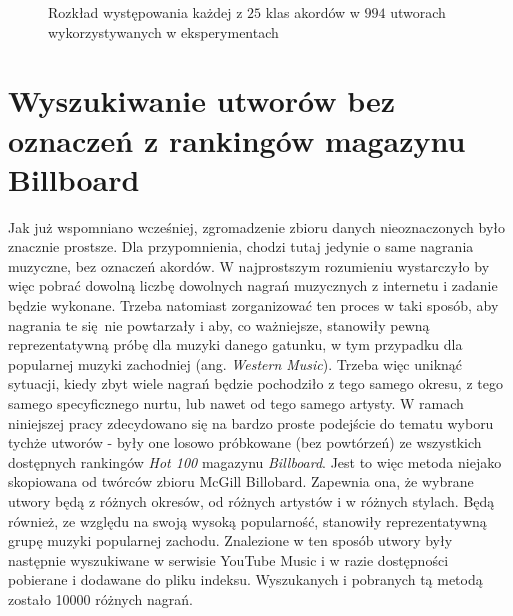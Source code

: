 \begin{figure}
    \centering
    \caption{Rozkład występowania każdej z $25$ klas akordów w $994$ utworach wykorzystywanych w eksperymentach}
    \label{fig:chords_histogram}
\end{figure}


\section{Wyszukiwanie utworów bez oznaczeń z rankingów magazynu Billboard}

Jak już wspomniano wcześniej, zgromadzenie zbioru danych nieoznaczonych było znacznie prostsze. Dla
przypomnienia, chodzi tutaj jedynie o same nagrania muzyczne, bez oznaczeń akordów. W najprostszym
rozumieniu wystarczyło by więc pobrać dowolną liczbę dowolnych nagrań muzycznych z internetu i
zadanie będzie wykonane. Trzeba natomiast zorganizować ten proces w taki sposób, aby nagrania te
się nie powtarzały i aby, co ważniejsze, stanowiły pewną reprezentatywną próbę dla muzyki danego
gatunku, w tym przypadku dla popularnej muzyki zachodniej (ang. \emph{Western Music}). Trzeba więc
uniknąć sytuacji, kiedy zbyt wiele nagrań będzie pochodziło z tego samego okresu, z tego samego
specyficznego nurtu, lub nawet od tego samego artysty. W ramach niniejszej pracy zdecydowano się na
bardzo proste podejście do tematu wyboru tychże utworów - były one losowo próbkowane (bez powtórzeń)
ze wszystkich dostępnych rankingów \emph{Hot 100} magazynu \emph{Billboard}. Jest to więc metoda
niejako skopiowana od twórców zbioru McGill Billobard. Zapewnia ona, że wybrane utwory będą z
różnych okresów, od różnych artystów i w różnych stylach. Będą również, ze względu na swoją wysoką
popularność, stanowiły reprezentatywną grupę muzyki popularnej zachodu. Znalezione w ten sposób
utwory były następnie wyszukiwane w serwisie YouTube Music i w razie dostępności pobierane i
dodawane do pliku indeksu. Wyszukanych i pobranych tą metodą zostało 10000 różnych nagrań.

